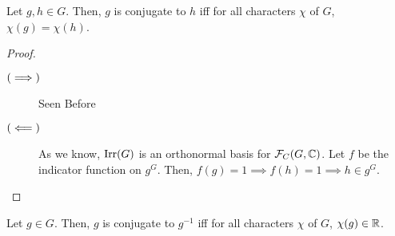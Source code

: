 \begin{lemma}
    Let $g, h \in G$. Then, $g$ is conjugate to $h$ iff for all characters $\chi$ of $G$, $\chi(g) = \chi(h)$.
\end{lemma}
\begin{proof}
    \hfill
    \begin{description}
        \item[$\left( \implies \right)$] Seen Before
        \item[$\left( \impliedby \right)$] As we know, $\operatorname{Irr}\!\left( G \right)$ is an orthonormal basis for $\mathcal{F}_C\!\left( G, \mathbb{C} \right)$. Let $f$ be the indicator function on $g^G$. Then, $f(g) = 1 \implies f(h) = 1 \implies h \in g^G$.
    \end{description}
\end{proof}
\begin{corollary}
    Let $g \in G$. Then, $g$ is conjugate to $g^{-1}$ iff for all characters $\chi$ of $G$, $\chi(g) \in \mathbb{R}$.
\end{corollary}

